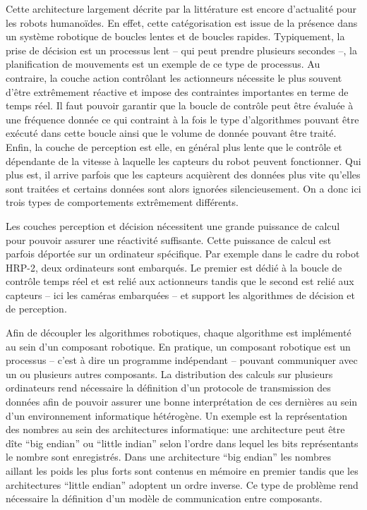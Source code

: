 Cette architecture largement décrite par la littérature est encore
d'actualité pour les robots humanoïdes. En effet, cette catégorisation
est issue de la présence dans un système robotique de boucles lentes
et de boucles rapides. Typiquement, la prise de décision est un
processus lent -- qui peut prendre plusieurs secondes --, la
planification de mouvements est un exemple de ce type de processus. Au
contraire, la couche action contrôlant les actionneurs nécessite le
plus souvent d'être extrêmement réactive et impose des contraintes
importantes en terme de temps réel. Il faut pouvoir garantir que la
boucle de contrôle peut être évaluée à une fréquence donnée ce qui
contraint à la fois le type d'algorithmes pouvant être exécuté dans
cette boucle ainsi que le volume de donnée pouvant être traité. Enfin,
la couche de perception est elle, en général plus lente que le
contrôle et dépendante de la vitesse à laquelle les capteurs du robot
peuvent fonctionner. Qui plus est, il arrive parfois que les capteurs
acquièrent des données plus vite qu'elles sont traitées et certains
données sont alors ignorées silencieusement. On a donc ici trois types
de comportements extrêmement différents.


Les couches perception et décision nécessitent une grande puissance de
calcul pour pouvoir assurer une réactivité suffisante. Cette puissance
de calcul est parfois déportée sur un ordinateur spécifique. Par
exemple dans le cadre du robot HRP-2, deux ordinateurs sont
embarqués. Le premier est dédié à la boucle de contrôle temps réel et
est relié aux actionneurs tandis que le second est relié aux capteurs
-- ici les caméras embarquées -- et support les algorithmes de
décision et de perception.


Afin de découpler les algorithmes robotiques, chaque algorithme est
implémenté au sein d'un composant robotique. En pratique, un composant robotique est un processus --
c'est à dire un programme indépendant -- pouvant communiquer avec un
ou plusieurs autres composants. La distribution des calculs sur
plusieurs ordinateurs rend nécessaire la définition d'un protocole de
transmission des données afin de pouvoir assurer une bonne
interprétation de ces dernières au sein d'un environnement
informatique hétérogène. Un exemple est la représentation des nombres
au sein des architectures informatique: une architecture peut être
dîte ``big endian'' ou ``little
indian'' selon l'ordre dans lequel
les bits représentants le nombre sont enregistrés. Dans une
architecture ``big endian'' les nombres aillant les poids les plus
forts sont contenus en mémoire en premier tandis que les architectures
``little endian'' adoptent un ordre inverse. Ce type de problème rend
nécessaire la définition d'un modèle de communication entre
composants.


